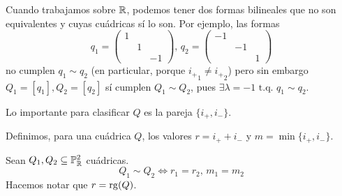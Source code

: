 \begin{obs}
  Cuando trabajamos sobre $\mathbb{R}$, podemos tener dos formas bilineales que no son 
  equivalentes y cuyas cuádricas sí lo son. Por ejemplo, las formas
  \[q_1 = \begin{pmatrix} 1 & & \\ & 1 & \\ & & -1 \end{pmatrix}, \, q_2 = 
  \begin{pmatrix} -1 & & \\ & -1 & \\ & & 1 \end{pmatrix}\]
  no cumplen $q_1 \sim q_2$ (en particular, porque ${i_{+}}_1 \neq {i_{+}}_2$) pero sin 
  embargo $Q_1 = [q_1], Q_2 = [q_2]$ sí cumplen $Q_1 \sim Q_2$, pues $\exists \lambda = -1
  \text{ t.q. } q_1 \sim q_2$.

  Lo importante para clasificar $Q$ es la pareja $\{i_+, i_-\}$.
\end{obs}
\begin{defi*}
  Definimos, para una cuádrica $Q$, los valores $r = i_+ + i_-$ y $m = \min \{i_+, i_-\}$. 
\end{defi*}
\begin{prop}
  Sean $Q_1, Q_2 \subseteq \mathbb{P}^2_{\mathbb{R}}$ cuádricas.
  \[Q_1 \sim Q_2 \iff r_1 = r_2, \, m_1 = m_2\]
  Hacemos notar que $r = \operatorname{rg}(Q)$.
\end{prop}

